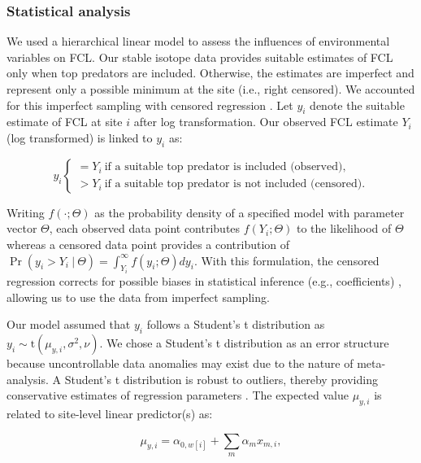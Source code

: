 \documentclass[11pt, class=article, crop=false]{standalone}
\begin{document}
\subsubsection{Statistical analysis}

We used a hierarchical linear model to assess the influences of environmental variables on FCL.
Our stable isotope data provides suitable estimates of FCL only when top predators are included.
Otherwise, the estimates are imperfect and represent only a possible minimum at the site (i.e., right censored).
We accounted for this imperfect sampling with censored regression \citep{terui_stream_2018, lunn_bugs_2012}.
Let $y_i$ denote the suitable estimate of FCL at site $i$ after log transformation.
Our observed FCL estimate $Y_i$ (log transformed) is linked to $y_i$ as:

\begin{equation}
    y_i 
    \begin{cases}
        = Y_i~\text{if a suitable top predator is included (observed)},\\
        > Y_i~\text{if a suitable top predator is not included (censored).}
    \end{cases}
\end{equation}

Writing $f(\cdot;\Theta)$ as the probability density of a specified model with parameter vector $\Theta$, each observed data point contributes $f(Y_i;\Theta)$ to the likelihood of $\Theta$ whereas a censored data point provides a contribution of $\Pr(y_i > Y_i~|~\Theta) = \int_{Y_i}^{\infty} f(y_i;\Theta) dy_i$.
With this formulation, the censored regression corrects for possible biases in statistical inference (e.g., coefficients) \citep{terui_stream_2018, lunn_bugs_2012}, allowing us to use the data from imperfect sampling.

Our model assumed that $y_i$ follows a Student's t distribution as $y_i \sim \mbox{t}(\mu_{y,i}, \sigma^2, \nu)$.
We chose a Student's t distribution as an error structure because uncontrollable data anomalies may exist due to the nature of meta-analysis.
A Student's t distribution is robust to outliers, thereby providing conservative estimates of regression parameters \citep{lunn_bugs_2012}.
The expected value $\mu_{y,i}$ is related to site-level linear predictor(s) as:

\begin{equation}
    \mu_{y,i} = \alpha_{0, w[i]} + \sum_m \alpha_m x_{m,i},
\end{equation}
\end{document}
